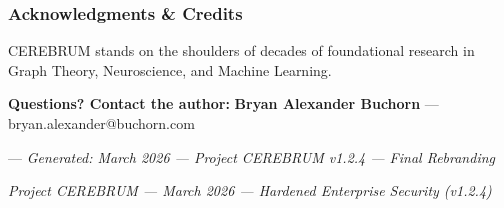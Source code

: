 \documentclass[11pt,article,oneside]{memoir}
\begin{document}
\subsubsection{\textbf{Acknow\-ledgments \& Credits}}
CEREBRUM stands on the shoulders of decades of found\-ational research in Graph Theory, Neuros\-cience, and Machine Learning.

\textbf{Questions? Contact the author:}
\textbf{Bryan Alexander Buchorn} — bryan.alexander@buchorn.com

---
\textit{Generated: March 2026 — Project CEREBRUM v1.2.4 — Final Rebranding}


\vspace{3em}
\begin{center}
    \small \textit{Project CEREBRUM — March 2026 — Hardened Enterprise Security (v1.2.4)}
\end{center}
\end{document}
